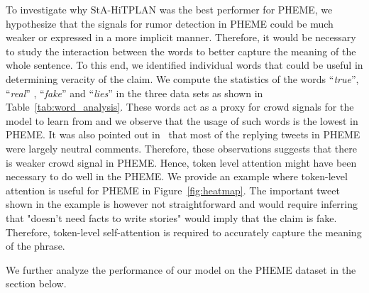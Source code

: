 \documentclass[letterpaper]{article} %
\begin{document}
To investigate why StA-HiTPLAN was the best performer for PHEME, we hypothesize that the signals for rumor detection in PHEME could be much weaker or expressed in a more implicit manner. Therefore, it would be necessary to study the interaction between the words to better capture the meaning of the whole sentence. To this end, we identified individual words that could be useful in determining veracity of the claim. We compute the statistics of the words ``{\it true}'', ``{\it real}'' , ``{\it fake}'' and ``{\it lies}'' in the three data sets as shown in Table~\ref{tab:word_analysis}. These words act as a proxy for crowd signals for the model to learn from and we observe that the usage of such words is the lowest in PHEME. It was also pointed out in~\cite{kumar19} that most of the replying tweets in PHEME were largely neutral comments. Therefore, these observations suggests that there is weaker crowd signal in PHEME. Hence, token level attention might have been necessary to do well in the PHEME.
We provide an example where token-level attention is useful for PHEME in Figure~\ref{fig:heatmap}. The important tweet shown in the example is however not straightforward and would require inferring that "doesn't need facts to write stories" would imply that the claim is fake. Therefore, token-level self-attention is required to accurately capture the meaning of the phrase.

We further analyze the performance of our model on the PHEME dataset in the section below.
\end{document}
